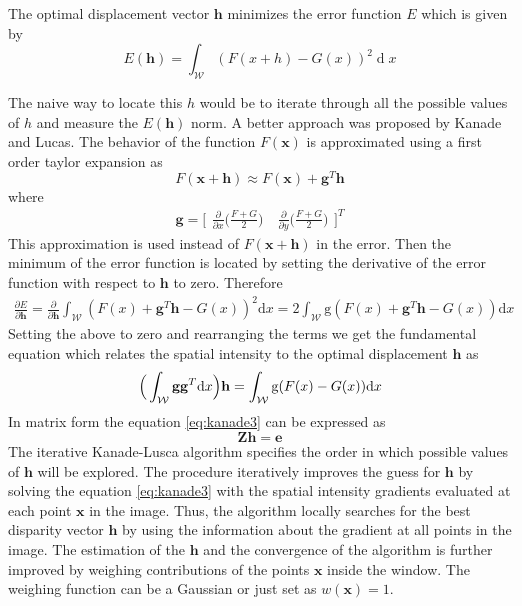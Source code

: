\documentclass[11pt,a4paper]{report}
\begin{document}
The optimal displacement vector $\mathbf{h}$ minimizes the error function $E$ which is
given by
\begin{equation}
E(\mathbf{h}) = \int_{\mathcal{W}} (F(x + h) - G(x))^2 \mathop{d}x
\end{equation}

The naive way to locate this $h$  would be to iterate through all the possible values of $h$ and measure the $E(\mathbf{h})$ norm. A
better approach was proposed by Kanade and Lucas. The behavior
of the function $F(\mathbf{x})$ is approximated using a first order taylor expansion as 
\begin{equation}\label{eq:kanade1}
F(\mathbf{x + h}) \approx F(\mathbf{x}) + \mathbf{g}^T\mathbf{h}
\end{equation}
where 
\begin{equation}
\mathbf{g} = \bigr[ \begin{smallmatrix} \frac{\partial}{\partial x}
    \bigr(\frac{F + G}{2}\bigl) \quad \frac{\partial}{\partial y} \bigr(\frac{F + G}{2}\bigl) \end{smallmatrix} \bigl]^T
\end{equation} 
This approximation is used instead of $F(\mathbf{x + h})$ in the error. Then the minimum of the error
function is located by setting the derivative of the error function with respect
to $\mathbf{h}$ to zero. Therefore
\begin{align}\label{eq:kanade2}
\frac{\partial E}{\partial \mathbf{h}} = \frac{\partial}{\partial \mathbf{h}}
\int_{\mathcal{W}} (F(x) + \mathbf{g}^T\mathbf{h} - G(x))^2 \mathrm{d}x =
2\int_{\mathcal{W}} \mathrm{g}(F(x) + \mathbf{g}^T\mathbf{h} - G(x))
\mathrm{d}x
\end{align}
Setting the above to zero and rearranging the terms we get the fundamental
equation which relates the spatial intensity to the optimal displacement
$\mathbf{h}$ as
\begin{align}\label{eq:kanade3}
\Bigr(\int_{\mathcal{W}} \mathbf{g}\mathbf{g}^T\mathrm{d}x\Bigl)\mathbf{h} = \int_{\mathcal{W}} \mathrm{g}(F(x) - G(x))
\mathrm{d}x
\end{align}
In matrix form the equation \ref{eq:kanade3} can be expressed as
\begin{equation}\label{eq:kanade4}
\mathbf{Z}\mathbf{h} = \mathbf{e}
\end{equation}
The iterative Kanade-Lusca algorithm specifies the order in which possible values of $\mathbf{h}$ will be explored. The procedure
iteratively improves the guess for $\mathbf{h}$ by solving the equation
\ref{eq:kanade3} with the spatial intensity
gradients evaluated at each point $\mathbf{x}$ in the image. Thus, the algorithm locally searches for the best disparity vector $\mathbf{h}$ by using the
information about the gradient at all points in the image. The estimation of the
$\mathbf{h}$ and the convergence of the algorithm is further improved by
weighing contributions of the points $\mathbf{x}$ inside the window. The
weighing function can be a Gaussian or just set as $w(\mathbf{x}) = 1$.
\end{document}
